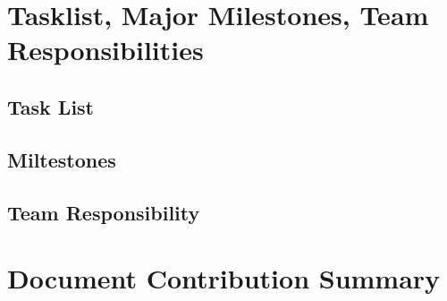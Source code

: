 \documentclass[12pt]{article}
\begin{document}
\section{Tasklist, Major Milestones, Team Responsibilities}
\subsection{Task List}
\subsection{Miltestones}
\subsection{Team Responsibility}

\section{Document Contribution Summary}
\hspace*{-8pt}
\end{document}
